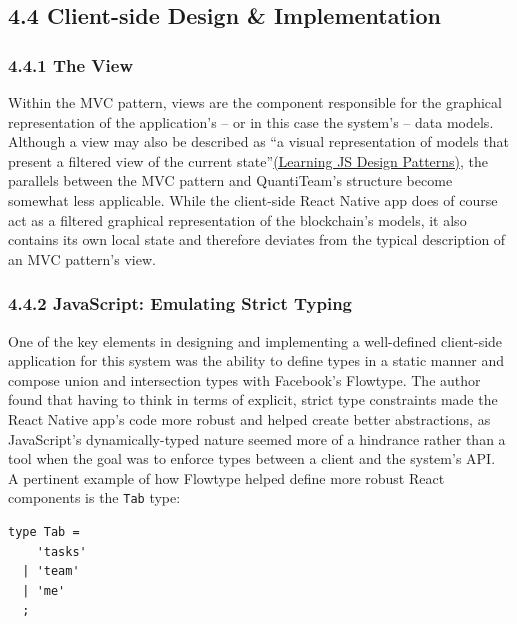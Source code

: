 \documentclass[12pt]{report}
\begin{document}
\subsection{4.4 Client-side Design \&
Implementation}\label{client-side-design-implementation}

\subsubsection{4.4.1 The View}\label{the-view}

Within the MVC pattern, views are the component responsible for the
graphical representation of the application's -- or in this case the
system's -- data
models\cite{krasner1988description}.
Although a view may also be described as ``a visual representation of
models that present a filtered view of the current
state''\href{https://addyosmani.com/resources/essentialjsdesignpatterns/book/\#detailmvc}{(Learning
JS Design Patterns)}, the parallels between the MVC pattern and
QuantiTeam's structure become somewhat less applicable. While the
client-side React Native app does of course act as a filtered graphical
representation of the blockchain's models, it also contains its own
local state and therefore deviates from the typical description of an
MVC pattern's view.

\subsubsection{4.4.2 JavaScript: Emulating Strict
Typing}\label{javascript-emulating-strict-typing}

One of the key elements in designing and implementing a well-defined
client-side application for this system was the ability to define types
in a static manner and compose union and intersection types with
Facebook's Flowtype. The author found that having to think in terms of
explicit, strict type constraints made the React Native app's code more
robust and helped create better abstractions, as JavaScript's
dynamically-typed nature seemed more of a hindrance rather than a tool
when the goal was to enforce types between a client and the system's
API.\\
A pertinent example of how Flowtype helped define more robust React
components is the \texttt{Tab} type:

\begin{verbatim}
type Tab =
    'tasks'
  | 'team'
  | 'me'
  ;
\end{verbatim}
\end{document}
